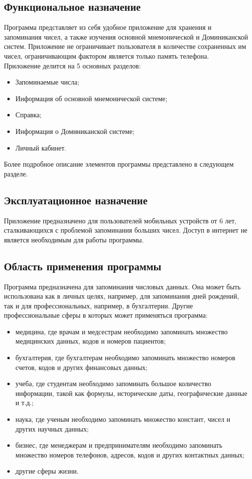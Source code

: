 \documentclass[draft]{article}
\begin{document}
\subsection{Функциональное назначение}
Программа представляет из себя удобное приложение для хранения и запоминания чисел, а также изучения основной мнемонической и Доминиканской систем. Приложение не ограничивает пользователя в количестве сохраненных им чисел, ограничивающим фактором является только память телефона.\\
Приложение делится на 5 основных разделов:
\begin{itemize}
\item Запоминаемые числа;
\item Информация об основной мнемонической системе;
\item Справка;
\item Информация о Доминиканской системе;
\item Личный кабинет.
\end{itemize}
Более подробное описание элементов программы представлено в следующем разделе.
\subsection{Эксплуатационное назначение}
Приложение предназначено для пользователей мобильных устройств от 6 лет, сталкивающихся с проблемой запоминания больших чисел. Доступ в интернет не является необходимым для работы программы.
\subsection{Область применения программы}
Программа предназначена для запоминания числовых данных. Она может быть использована как в личных целях, например, для запоминания дней рождений, так и для профессиональных, например, в бухгалтерии. Другие профессиональные сферы в которых может применяться программа:
\begin{itemize}
\item медицина, где врачам и медсестрам необходимо запоминать множество медицинских данных, кодов и номеров пациентов;
\item бухгалтерия, где бухгалтерам необходимо запоминать множество номеров счетов, кодов и других финансовых данных;
\item учеба, где студентам необходимо запоминать большое количество информации, такой как формулы, исторические даты, географические данные и т.д.;
\item наука, где ученым необходимо запоминать множество констант, чисел и других научных данных;
\item бизнес, где менеджерам и предпринимателям необходимо запоминать множество номеров телефонов, адресов, кодов и других контактных данных;
\item другие сферы жизни.
\end{itemize}
\newpage
\end{document}
